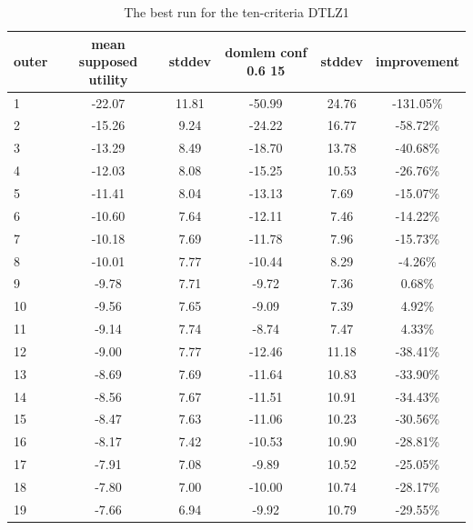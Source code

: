 \begin{table}[htb]
  \centering
  \begin{tabular}{l c c c c c}
    \hline
outer & mean supposed utility & stddev & domlem conf 0.6 15 & stddev & improvement \\
    \hline
    \hline
1 & -22.07 & 11.81 & -50.99 & 24.76 & -131.05\% \\
2 & -15.26 & 9.24 & -24.22 & 16.77 & -58.72\% \\
3 & -13.29 & 8.49 & -18.70 & 13.78 & -40.68\% \\
4 & -12.03 & 8.08 & -15.25 & 10.53 & -26.76\% \\
5 & -11.41 & 8.04 & -13.13 & 7.69 & -15.07\% \\
6 & -10.60 & 7.64 & -12.11 & 7.46 & -14.22\% \\
7 & -10.18 & 7.69 & -11.78 & 7.96 & -15.73\% \\
8 & -10.01 & 7.77 & -10.44 & 8.29 & -4.26\% \\
9 & -9.78 & 7.71 & -9.72 & 7.36 & 0.68\% \\
10 & -9.56 & 7.65 & -9.09 & 7.39 & 4.92\% \\
11 & -9.14 & 7.74 & -8.74 & 7.47 & 4.33\% \\
12 & -9.00 & 7.77 & -12.46 & 11.18 & -38.41\% \\
13 & -8.69 & 7.69 & -11.64 & 10.83 & -33.90\% \\
14 & -8.56 & 7.67 & -11.51 & 10.91 & -34.43\% \\
15 & -8.47 & 7.63 & -11.06 & 10.23 & -30.56\% \\
16 & -8.17 & 7.42 & -10.53 & 10.90 & -28.81\% \\
17 & -7.91 & 7.08 & -9.89 & 10.52 & -25.05\% \\
18 & -7.80 & 7.00 & -10.00 & 10.74 & -28.17\% \\
19 & -7.66 & 6.94 & -9.92 & 10.79 & -29.55\% \\
    \hline
  \end{tabular}
  \caption{The best run for the ten-criteria DTLZ1}
  \label{t:un_best_3}
\end{table}


